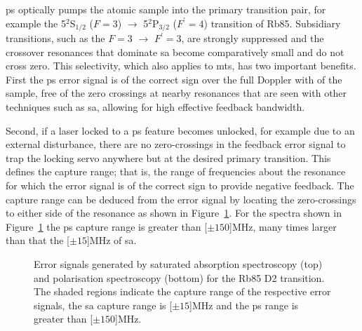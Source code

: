 \Gls{ps} optically pumps the atomic sample into the primary transition pair, for example the  5$^2$S$_{1/2}$ ($F=3$) $\rightarrow$ 5$^2$P$_{3/2}$ ($F^\prime=4$) transition of Rb85.
Subsidiary transitions, such as the ${F=3}$ ${\rightarrow}$ ${F^\prime=3}$, are strongly suppressed and the crossover resonances that dominate \gls{sa} become comparatively small and do not cross zero.
This selectivity, which also applies to \gls{mts}, has two important benefits.
First the \gls{ps} error signal is of the correct sign over the full Doppler with of the sample, free of the zero crossings at nearby resonances that are seen with other techniques such as \gls{sa}, allowing for high effective feedback bandwidth.

Second, if a laser locked to a \gls{ps} feature becomes unlocked, for example due to an external disturbance, there are no zero-crossings in the feedback error signal to trap the locking servo anywhere but at the desired primary transition.
This defines the capture range; that is, the range of frequencies about the resonance for which the error signal is of the correct sign to provide negative feedback.
The capture range can be deduced from the error signal by locating the zero-crossings to either side of the resonance as shown in Figure~\ref{figure:capture_range}.
For the spectra shown in Figure~\ref{figure:capture_range} the \gls{ps} capture range is greater than \unit[$\pm150$]{MHz}, many times larger than that the \unit[$\pm15$]{MHz} of \gls{sa}.

\begin{figure}
\center

\caption[Saturated absorption spectroscopy and polarisation spectroscopy capture ranges.]{Error signals generated by saturated absorption spectroscopy (top) and polarisation spectroscopy (bottom) for the Rb85 D2 transition.
The shaded regions indicate the capture range of the respective error signals, the \gls{sa} capture range is \unit[$\pm15$]{MHz} and the \gls{ps} range is greater than \unit[$\pm150$]{MHz}.}
\label{figure:capture_range}
\end{figure}
